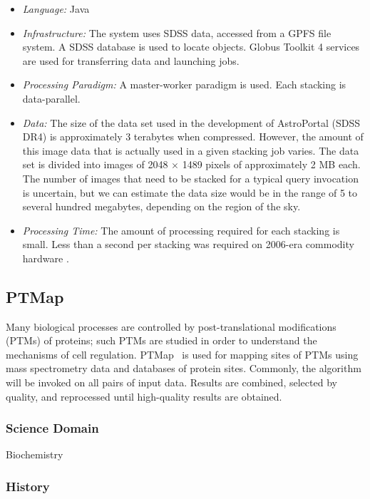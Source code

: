 \documentclass[10pt,letterpaper]{article}
\begin{document}
\begin {itemize}
\item {\em Language:} Java
\item {\em Infrastructure:} The system uses SDSS data, accessed from a GPFS file system.
A SDSS database is used to locate objects.  Globus Toolkit 4 services are used for
transferring data and launching jobs.
\item {\em Processing Paradigm:} A master-worker paradigm is used.  Each stacking is data-parallel.
\item {\em Data:} The size of the data set used in the development of AstroPortal (SDSS DR4)
is approximately 3 terabytes when compressed.  However, the amount of this image
data that is actually used in a given stacking job varies.  The data set
is divided into images of 2048 $\times$ 1489 pixels of approximately 2 MB
each.  The number of images that need to be stacked for a typical query invocation
is uncertain, but we can estimate the data size would be in the range of 5 to several
hundred megabytes, depending on the region of the sky.

\item {\em Processing Time:} The amount of processing required for each stacking is small.
Less than a second per stacking was required on 2006-era commodity hardware .



\end{itemize}

\subsection{PTMap}

Many biological processes are controlled by post-translational
modifications (PTMs) of proteins; such
PTMs are studied in order to understand the mechanisms of cell regulation.
PTMap~\cite{ptmap09} is used for mapping sites of PTMs
using mass spectrometry data and databases of protein sites.
Commonly, the algorithm will be invoked on all pairs
of input data.  Results are combined, selected by quality, and
reprocessed until high-quality results are obtained.

\subsubsection{Science Domain} Biochemistry

\subsubsection{History}
\end{document}
